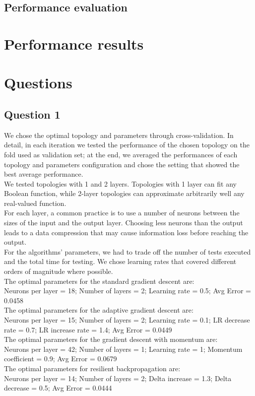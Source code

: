 \documentclass{article}
\begin{document}
\subsection{Performance evaluation}


\section{Performance results}


\section{Questions}
\subsection{Question 1}
We chose the optimal topology and parameters through cross-validation. In detail, in each iteration we tested the performance of the chosen topology on the fold used as validation set; at the end, we averaged the performances of each topology and parameters configuration and chose the setting that showed the best average performance.\\
We tested topologies with 1 and 2 layers. Topologies with 1 layer can fit any Boolean function, while 2-layer topologies can approximate arbitrarily well any real-valued function.\\
For each layer, a common practice is to use a number of neurons between the sizes of the input and the output layer. Choosing less neurons than the output leads to a data compression that may cause information loss before reaching the output.\\
For the algorithms' parameters, we had to trade off the number of tests executed and the total time for testing. We chose learning rates that covered different orders of magnitude where possible.\\
The optimal parameters for the standard gradient descent are:\\
Neurons per layer = 18; Number of layers = 2; Learning rate = 0.5; Avg Error = 0.0458\\
The optimal parameters for the adaptive gradient descent are:\\
Neurons per layer = 15; Number of layers = 2; Learning rate = 0.1; LR decrease rate = 0.7; LR increase rate = 1.4; Avg Error = 0.0449\\
The optimal parameters for the gradient descent with momentum are:\\
Neurons per layer = 42; Number of layers = 1; Learning rate = 1; Momentum coefficient = 0.9; Avg Error = 0.0679\\
The optimal parameters for resilient backpropagation are:\\
Neurons per layer = 14; Number of layers = 2; Delta increase = 1.3; Delta decrease = 0.5; Avg Error = 0.0444\\
\end{document}
